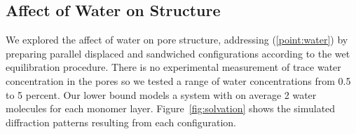 \documentclass{article}
\begin{document}
  \subsection{Affect of Water on Structure}

  We explored the affect of water on pore structure, addressing (\ref{point:water})
  by preparing parallel displaced and sandwiched configurations according to the
  wet equilibration procedure. There is no experimental measurement of trace
  water concentration in the pores so we tested a range of water concentrations
  from 0.5 to 5 percent. Our lower bound models a system with on average 2 water
  molecules for each monomer layer. Figure~\ref{fig:solvation} shows the
  simulated diffraction patterns resulting from each configuration.

  \newlength{\tempdima}
  \newcommand{\rowname}[1]%
  {\rotatebox{90}{\makebox[\tempdima][c]{\textbf{#1}}}}
  
  \renewcommand{\thesubfigure}{\alph{subfigure}}
  \newcommand{\mycaption}[1]%
  {\refstepcounter{subfigure}\textbf{(\thesubfigure) }{\ignorespaces #1}}
  
\end{document}

